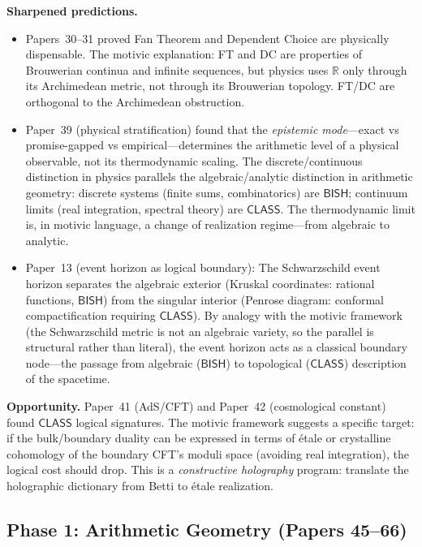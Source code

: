 \documentclass[11pt,a4paper]{article}
\theoremstyle{plain}
\theoremstyle{definition}
\newcommand{\BISH}{\textsf{BISH}}
\newcommand{\CLASS}{\textsf{CLASS}}
\newcommand{\R}{\mathbb{R}}
\begin{document}
\medskip
\noindent\textbf{Sharpened predictions.}
\begin{itemize}
\item Papers~30--31 proved Fan Theorem and Dependent Choice are physically dispensable. The motivic explanation: FT and DC are properties of Brouwerian continua and infinite sequences, but physics uses $\R$ only through its Archimedean metric, not through its Brouwerian topology. FT/DC are orthogonal to the Archimedean obstruction.

\item Paper~39 (physical stratification) found that the \emph{epistemic mode}---exact vs promise-gapped vs empirical---determines the arithmetic level of a physical observable, not its thermodynamic scaling. The discrete/continuous distinction in physics parallels the algebraic/analytic distinction in arithmetic geometry: discrete systems (finite sums, combinatorics) are $\BISH$; continuum limits (real integration, spectral theory) are $\CLASS$. The thermodynamic limit is, in motivic language, a change of realization regime---from algebraic to analytic.

\item Paper~13 (event horizon as logical boundary): The Schwarzschild event horizon separates the algebraic exterior (Kruskal coordinates: rational functions, $\BISH$) from the singular interior (Penrose diagram: conformal compactification requiring $\CLASS$). By analogy with the motivic framework (the Schwarzschild metric is not an algebraic variety, so the parallel is structural rather than literal), the event horizon acts as a classical boundary node---the passage from algebraic ($\BISH$) to topological ($\CLASS$) description of the spacetime.
\end{itemize}

\noindent\textbf{Opportunity.} Paper~41 (AdS/CFT) and Paper~42 (cosmological constant) found $\CLASS$ logical signatures. The motivic framework suggests a specific target: if the bulk/boundary duality can be expressed in terms of \'etale or crystalline cohomology of the boundary CFT's moduli space (avoiding real integration), the logical cost should drop. This is a \emph{constructive holography} program: translate the holographic dictionary from Betti to \'etale realization.

\subsection{Phase 1: Arithmetic Geometry (Papers 45--66)}\label{app:arith-geom}
\end{document}
